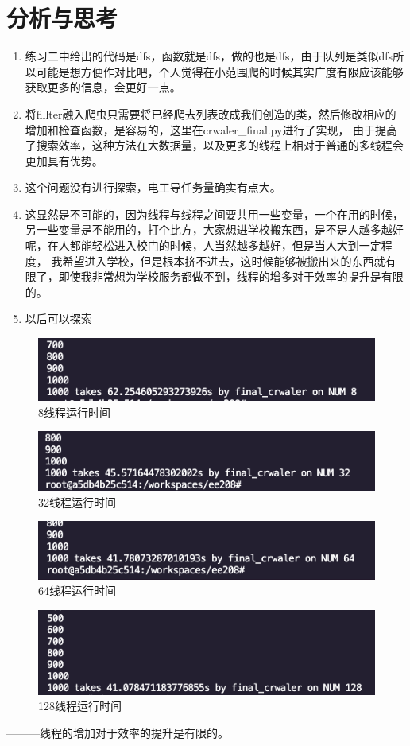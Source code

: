 \documentclass[UTF8]{ctexart}
\begin{document}
    \section{分析与思考}
    \begin{enumerate}
        \item 练习二中给出的代码是dfs，函数就是dfs，做的也是dfs，由于队列是类似dfs所以可能是想方便作对比吧，个人觉得在小范围爬的时候其实广度有限应该能够获取更多的信息，会更好一点。
        \item 将fillter融入爬虫只需要将已经爬去列表改成我们创造的类，然后修改相应的增加和检查函数，是容易的，这里在crwaler\_final.py进行了实现，
        由于提高了搜索效率，这种方法在大数据量，以及更多的线程上相对于普通的多线程会更加具有优势。
        \item 这个问题没有进行探索，电工导任务量确实有点大。
        \item 这显然是不可能的，因为线程与线程之间要共用一些变量，一个在用的时候，另一些变量是不能用的，打个比方，大家想进学校搬东西，是不是人越多越好呢，在人都能轻松进入校门的时候，人当然越多越好，但是当人大到一定程度，
        我希望进入学校，但是根本挤不进去，这时候能够被搬出来的东西就有限了，即使我非常想为学校服务都做不到，线程的增多对于效率的提升是有限的。
        \item 以后可以探索
    \end{enumerate}
    \begin{figure}[ht]
        \centering
        \includegraphics[scale=0.5]{img/num8.png}
        \caption{8线程运行时间}
    \end{figure}
    \begin{figure}[ht]
        \centering
        \includegraphics[scale=0.5]{img/num32.png}
        \caption{32线程运行时间}
    \end{figure}
    \begin{figure}[ht]
        \centering
        \includegraphics[scale=0.5]{img/num64.png}
        \caption{64线程运行时间}
    \end{figure}
    \begin{figure}[ht]
        \centering
        \includegraphics[scale=0.5]{img/num128.png}
        \caption{128线程运行时间}
    \end{figure}

    
    ———线程的增加对于效率的提升是有限的。
\end{document}
